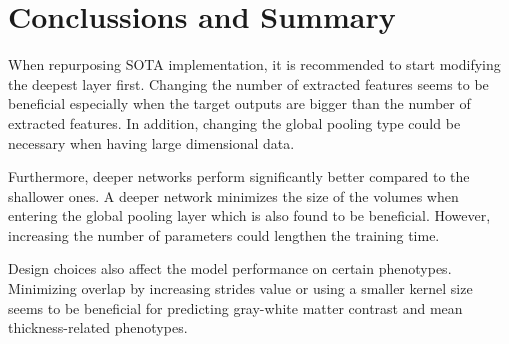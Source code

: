 \documentclass{article}
\begin{document}
   
    \section*{Conclussions and Summary}
    When repurposing SOTA implementation, it is recommended to start modifying the deepest layer first. 
    Changing the number of extracted features seems to be beneficial especially when the target outputs are bigger than the number of extracted features. 
    In addition, changing the global pooling type could be necessary when having large dimensional data.

    Furthermore, deeper networks perform significantly better compared to the shallower ones. 
    A deeper network minimizes the size of the volumes when entering the global pooling layer which is also found to be beneficial. 
    However, increasing the number of parameters could lengthen the training time.
    
    Design choices also affect the model performance on certain phenotypes. 
    Minimizing overlap by increasing strides value or using a smaller kernel size seems to be beneficial for predicting gray-white matter contrast and mean thickness-related phenotypes.
    
    \printbibliography
\end{document}
